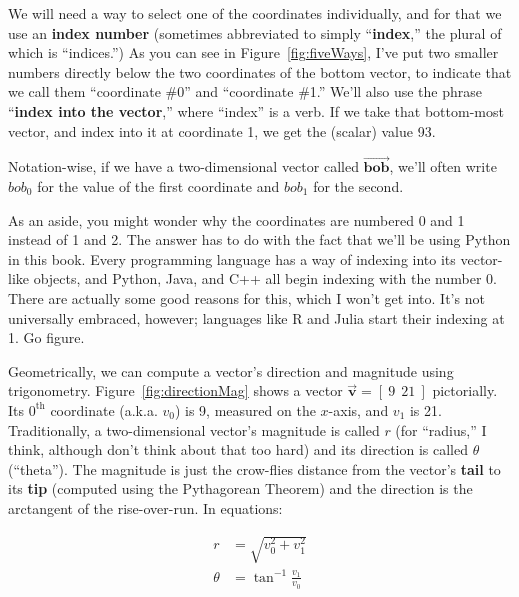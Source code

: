 
We will need a way to select one of the coordinates individually, and for that
we use an \textbf{index number} (sometimes abbreviated to simply
``\textbf{index},'' the plural of which is ``indices.'') As you can see in
Figure~\ref{fig:fiveWays}, I've put two smaller numbers directly below the two
coordinates of the bottom vector, to indicate that we call them ``coordinate
\#0'' and ``coordinate \#1.'' We'll also use the phrase ``\textbf{index into
the vector},'' where ``index'' is a verb. If we take that bottom-most vector,
and index into it at coordinate 1, we get the (scalar) value 93.

Notation-wise, if we have a two-dimensional vector called
$\overrightarrow{\textbf{bob}}$, we'll often write $bob_0$ for the value of the
first coordinate and $bob_1$ for the second.

As an aside, you might wonder why the coordinates are numbered 0 and 1 instead
of 1 and 2. The answer has to do with the fact that we'll be using Python in
this book. Every programming language has a way of indexing into its
vector-like objects, and Python, Java, and C++ all begin indexing with the
number 0. There are actually some good reasons for this, which I won't get
into. It's not universally embraced, however; languages like R and Julia start
their indexing at 1. Go figure.


Geometrically, we can compute a vector's direction and magnitude using
trigonometry. Figure~\ref{fig:directionMag} shows a vector
$\overrightarrow{\textbf{v}} = [\ 9 \ \ 21\ ]$ pictorially. Its $0^\text{th}$
coordinate (a.k.a. $v_0$) is 9, measured on the $x$-axis, and $v_1$ is 21.
Traditionally, a two-dimensional vector's magnitude is called $r$ (for
``radius,'' I think, although don't think about that too hard) and its
direction is called $\theta$ (``theta''). The magnitude is just the crow-flies
distance from the vector's \textbf{tail} to its \textbf{tip} (computed using
the Pythagorean Theorem) and the direction is the arctangent of the
rise-over-run. In equations:

\vspace{-.25in}
\begin{align*}
r &= \sqrt{v_0^2 + v_1^2} \\
\theta &= \tan^{-1} \frac{v_1}{v_0} \\
\end{align*}
\vspace{-.55in}

